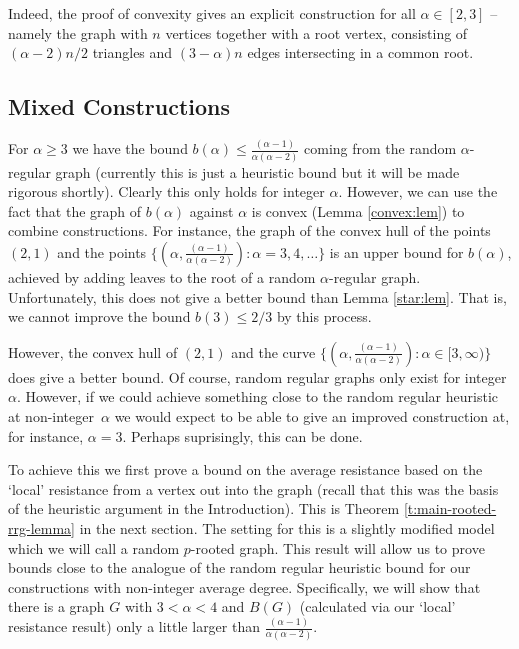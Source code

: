 \documentclass[11pt]{article}
\theoremstyle{remark}
\def\a{\alpha}
\begin{document}
Indeed, the proof of convexity gives an explicit construction for all
$\alpha\in[2,3]$ -- namely the graph with $n$ vertices together with a
root vertex, consisting of $(\alpha-2)n/2$ triangles and $(3-\alpha)n$
edges intersecting in a common root.

\subsection{Mixed Constructions}

For $\a\geq3$ we have the bound $b(\a)\leq\frac{(\a-1)}{\a(\a-2)}$ coming from the random $\a$-regular graph (currently this is just a heuristic bound but it will be made rigorous shortly). Clearly this only holds for integer $\a$. However, we can use the fact that the graph of $b(\a)$ against $\a$ is convex (Lemma \ref{convex:lem}) to combine constructions. For instance, the graph of the convex hull of the points $(2,1)$ and the points $\{(\a,\frac{(\a-1)}{\a(\a-2)}):\a=3,4,\dots\}$ is an upper bound for $b(\a)$, achieved by adding leaves to the root of a random $\a$-regular graph. Unfortunately, this does not give a better bound than Lemma \ref{star:lem}. That is, we cannot improve the bound $b(3)\leq2/3$ by this process.

However, the convex hull of $(2,1)$ and the curve $\{(\a,\frac{(\a-1)}{\a(\a-2)}):\a\in[3,\infty)\}$ does give a better bound. Of course, random regular graphs only exist for integer $\a$. However, if we could achieve something close to the random regular heuristic at non-integer~$\a$ we would expect to be able to give an improved construction at, for instance, $\a=3$. Perhaps suprisingly, this can be done. 

To achieve this we first prove a bound on the average resistance based on the `local' resistance from a vertex out into the graph (recall that this was the basis of the heuristic argument in the Introduction). This is Theorem \ref{t:main-rooted-rrg-lemma} in the next section. The setting for this is a slightly modified model which we will call a random $p$-rooted graph. This result will allow us to prove bounds close to the analogue of the random regular heuristic bound for our constructions with non-integer average degree. Specifically, we will show that there is a graph $G$ with $3<\a<4$ and $B(G)$ (calculated via our `local' resistance result) only a little larger than $\frac{(\a-1)}{\a(\a-2)}$.
\end{document}
